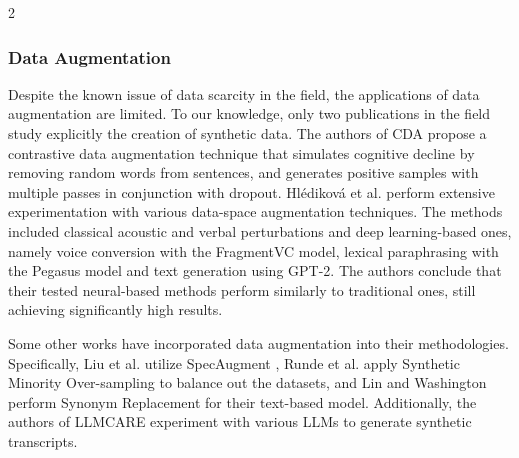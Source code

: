 \documentclass[10pt]{article}
\begin{document}
\begin{multicols}{2}
\subsubsection{Data Augmentation} \par Despite the known issue of data scarcity
in the field, the applications of data augmentation are limited. To our
knowledge, only two publications in the field study explicitly the creation of
synthetic data. The authors of CDA \cite{duanCDAContrastiveData2023} propose a
contrastive data augmentation technique that simulates cognitive decline by
removing random words from sentences, and generates positive samples with
multiple passes in conjunction with dropout. Hlédiková et al.
\cite{hledikovaDataAugmentationDementia2022} perform extensive experimentation
with various data-space augmentation techniques. The methods included classical
acoustic and verbal perturbations and deep learning-based ones, namely voice
conversion with the FragmentVC model, lexical paraphrasing with the Pegasus
model and text generation using GPT-2. The authors conclude that their tested
neural-based methods perform similarly to traditional ones, still achieving
significantly high results. \par Some other works have incorporated data
augmentation into their methodologies. Specifically, Liu et al.
\cite{liuDetectingAlzheimersDisease2021} utilize SpecAugment
\cite{parkSpecAugmentSimpleData2019}, Runde et al.
\cite{rundeOptimizationNaturalLanguage2024} apply Synthetic Minority
Over-sampling to balance out the datasets, and Lin and Washington perform
Synonym Replacement for their text-based model. Additionally, the authors of
LLMCARE \cite{zolnourLLMCAREEarlyDetection2025} experiment with various LLMs to
generate synthetic transcripts.


\end{multicols}
\end{document}
